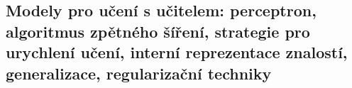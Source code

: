 \subsection{Modely pro učení s učitelem: perceptron, algoritmus zpětného šíření, strategie pro urychlení učení, interní reprezentace znalostí, generalizace, regularizační techniky}
